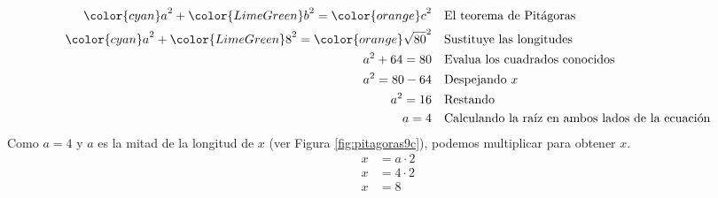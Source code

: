 \begin{solutionbox}{16cm}
\begin{minipage}{0.75\textwidth}
        \begin{align*}
            {\color{cyan}a}^2+{\color{LimeGreen}b}^2  ={\color{orange}c}^2         & \text{\quad El teorema de Pitágoras}                          \\
            {\color{cyan}a}^2+{\color{LimeGreen}8}^2  ={\color{orange}\sqrt{80}}^2 & \text{\quad Sustituye las longitudes}                         \\
            a^2+64   =80                                                           & \text{\quad Evalua los cuadrados conocidos}                   \\
            a^2=80-64                                                              & \text{\quad Despejando } x                                    \\
            a^2=16                                                                 & \text{\quad Restando}                                         \\
            a=4                                                                    & \text{\quad Calculando la raíz en ambos lados de la ecuación} \\
        \end{align*}
        Como $a=4$ y $a$ es la mitad de la longitud de $x$ (ver Figura \ref{fig:pitagoras9c}), podemos multiplicar para obtener $x$.
        \begin{align*}
            x & = a\cdot 2 \\
            x & = 4\cdot 2 \\
            x & = 8        \\
        \end{align*}
    \end{minipage}
\end{solutionbox}
